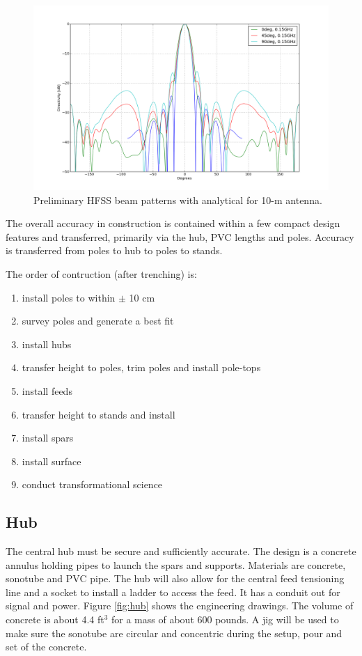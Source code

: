 \documentclass[11pt]{article}
\begin{document}
\begin{figure}[H]
\centering
\includegraphics[width=12cm]{plots/pp.png}
\caption{Preliminary HFSS beam patterns with analytical for 10-m antenna.}
\label{fig:pp}
\end{figure}

The overall accuracy in construction is contained within a few compact design features and transferred, primarily via the hub, PVC lengths and poles.  Accuracy is transferred from poles to hub to poles to stands.

The order of contruction (after trenching) is:
\begin{enumerate}
\item install poles to within $\pm$ 10 cm
\item survey poles and generate a best fit
\item install hubs
\item transfer height to poles, trim poles and install pole-tops
\item install feeds
\item transfer height to stands and install
\item install spars
\item install surface
\item conduct transformational science
\end{enumerate}

\subsection{Hub}
The central hub must be secure and sufficiently accurate.  The design is a concrete annulus holding pipes to launch the spars and supports.  Materials are concrete, sonotube and PVC pipe. The hub will also allow for the central feed tensioning line and a socket to install a ladder to access the feed.  It has a conduit out for signal and power.  Figure \ref{fig:hub} shows the engineering drawings.  The volume of concrete is about 4.4 ft$^3$ for a mass of about 600 pounds.
A jig will be used to make sure the sonotube are circular and concentric during the setup, pour and set of the concrete.
\end{document}
